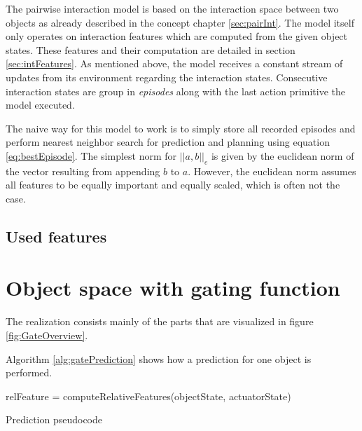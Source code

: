 The pairwise interaction model is based on the interaction space between two objects as already described in the concept chapter \ref{sec:pairInt}. The model itself only operates on interaction features which are computed from the given object states. These features and their computation are detailed in section \ref{sec:intFeatures}. As mentioned above, the model receives a constant stream of updates from its environment regarding the interaction states. Consecutive interaction states are group in \textit{episodes} along with the last action primitive the model executed. 

The naive way for this model to work is to simply store all recorded episodes and perform nearest neighbor search for prediction and planning using equation \ref{eq:bestEpisode}. The simplest norm for $||a,b||_e$ is given by the euclidean norm of the vector resulting from appending $b$ to $a$. However, the euclidean norm assumes all features to be equally important and equally scaled, which is often not the case.





\subsection{Used features \label{sec:intFeatures}}



\section{Object space with gating function \label{sec:gateRealization}}

The realization consists mainly of the parts that are visualized in figure \ref{fig:GateOverview}. 

Algorithm \ref{alg:gatePrediction} shows how a prediction for one object is performed. 


\begin{algorithm}
	\BlankLine
	relFeature = computeRelativeFeatures(objectState, actuatorState)\\
	\caption{Prediction pseudocode}
	\label{alg:gatePrediction}
\end{algorithm}

